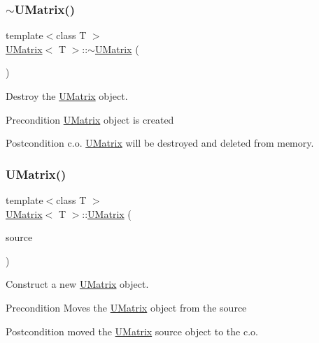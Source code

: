 \subsubsection{\texorpdfstring{$\sim$UMatrix()}{~UMatrix()}}
{\footnotesize\ttfamily template$<$class T $>$ \\
\mbox{\hyperlink{class_u_matrix}{U\+Matrix}}$<$ T $>$\+::$\sim$\mbox{\hyperlink{class_u_matrix}{U\+Matrix}} (\begin{DoxyParamCaption}{ }\end{DoxyParamCaption})}



Destroy the \mbox{\hyperlink{class_u_matrix}{U\+Matrix}} object. 

\begin{DoxyPrecond}{Precondition}
\mbox{\hyperlink{class_u_matrix}{U\+Matrix}} object is created 
\end{DoxyPrecond}
\begin{DoxyPostcond}{Postcondition}
c.\+o. \mbox{\hyperlink{class_u_matrix}{U\+Matrix}} will be destroyed and deleted from memory. 
\end{DoxyPostcond}
\mbox{\label{class_u_matrix_ab70aed159f4542aa4bbf9a222bd328ef}} 
\subsubsection{\texorpdfstring{UMatrix()}{UMatrix()}\hspace{0.1cm}{\footnotesize\ttfamily [5/5]}}
{\footnotesize\ttfamily template$<$class T $>$ \\
\mbox{\hyperlink{class_u_matrix}{U\+Matrix}}$<$ T $>$\+::\mbox{\hyperlink{class_u_matrix}{U\+Matrix}} (\begin{DoxyParamCaption}\item[{\mbox{\hyperlink{class_u_matrix}{U\+Matrix}}$<$ T $>$ \&\&}]{source }\end{DoxyParamCaption})}



Construct a new \mbox{\hyperlink{class_u_matrix}{U\+Matrix}} object. 

\begin{DoxyPrecond}{Precondition}
Moves the \mbox{\hyperlink{class_u_matrix}{U\+Matrix}} object from the source 
\end{DoxyPrecond}
\begin{DoxyPostcond}{Postcondition}
moved the \mbox{\hyperlink{class_u_matrix}{U\+Matrix}} source object to the c.\+o.
\end{DoxyPostcond}

